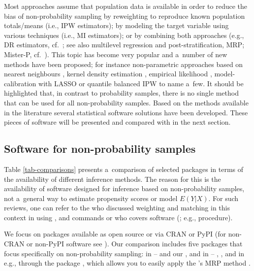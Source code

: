 \documentclass[nojss]{jss}
\begin{document}
Most approaches assume that population data is available in order to
reduce the bias of non-probability sampling by reweighting to reproduce
known population totals/means (i.e., IPW estimators); by modeling the
target variable using various techniques (i.e., MI estimators); or by
combining both approaches (e.g., DR estimators,
cf.~\citet{chen2020doubly}; see also multilevel regression and
post-stratification, MRP; Mister-P,
cf.~\citet{gelman1997poststratification}). This topic has become very
popular and a~number of new methods have been proposed; for instance
non-parametric approaches based on nearest neighbours
\citep{yang2021integration}, kernel density estimation
\citep{chen_nonparametric_2022}, empirical likelihood
\citep{kim2023empirical}, model-calibration with LASSO \citep{chen2018}
or quantile balanced IPW \citep{beresewicz2025} to name a~few. It should
be highlighted that, in contrast to probability samples, there is no
single method that can be used for all non-probability samples. Based on
the methods available in the literature several statistical software
solutions have been developed. These pieces of software will be
presented and compared with  \citep{nonprobsvy} in the
next section.

\subsection{Software for non-probability samples}\label{sec-software}

Table \ref{tab-comparisons} presents a~comparison of selected packages
in terms of the availability of different inference methods. The reason
for this is the availability of software designed for inference based on
non-probability samples, not a~general way to estimate propensity scores
or model \(E(Y|X)\). For such reviews, one can refer to the
\citet[Chapter 6]{valliant2018survey} who discussed weighting and
matching in this context in  \citep{Stata2025} using
,  and  commands or
\citet[e.g., Chapter 8]{lohr2021sas} who covers  software
(\citet{sas94}; e.g.,  procedure).

We focus on packages available as open source or via CRAN or PyPI (for
non-CRAN or non-PyPI software see \citet{cobo2024software}). Our
comparison includes five packages that focus specifically on
non-probability sampling: in  -- 
\citep{NonProbEst} and our , and in  --
 \citep{sarig2023balancepythonpackage}, 
\citep{castro2024inps}, and in  \citep{carpenter2017stan}
e.g., through the  package , which allows you
to easily apply the 's MRP method \citep{rstanarm}.
\end{document}

